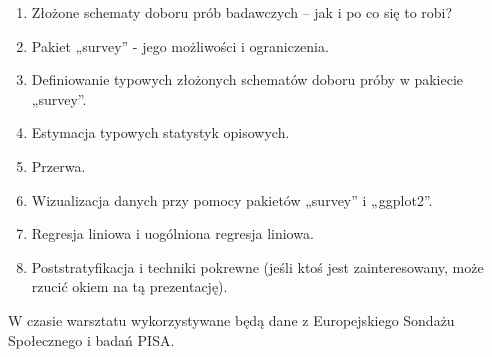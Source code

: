 \documentclass[\main/boa.tex]{subfiles}
\begin{document}
\planwarsztatu
\begin{enumerate}
\item Złożone schematy doboru prób badawczych – jak i po co się to robi?
\item Pakiet „survey” - jego możliwości i ograniczenia.
\item Definiowanie typowych złożonych schematów doboru próby w pakiecie „survey”.
\item Estymacja typowych statystyk opisowych.
\item Przerwa.
\item Wizualizacja danych przy pomocy pakietów „survey” i „ggplot2”.
\item Regresja liniowa i uogólniona regresja liniowa.
\item Poststratyfikacja i techniki pokrewne (jeśli ktoś jest zainteresowany, może rzucić okiem na tą prezentację).
\end{enumerate}
W czasie warsztatu wykorzystywane będą dane z Europejskiego Sondażu Społecznego i badań PISA.
\end{document}

